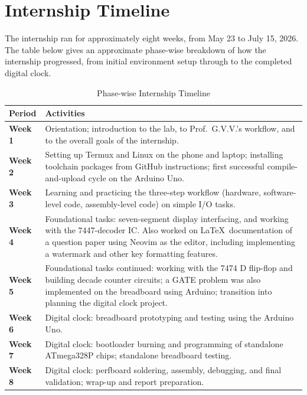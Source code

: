 \documentclass[12pt,a4paper]{report}
\begin{document}
\chapter{Internship Timeline}
\label{ch:timeline}

The internship ran for approximately eight weeks, from May 23 to July 15, 2026. The table below gives an approximate phase-wise breakdown of how the internship progressed, from initial environment setup through to the completed digital clock.

\begin{table}[H]
\centering
\caption{Phase-wise Internship Timeline}
\label{tab:timeline}
\begin{tabular}{@{}>{\bfseries}lp{10.8cm}@{}}
\toprule
Period & \textbf{Activities} \\
\midrule
Week 1 & Orientation; introduction to the lab, to Prof.\ G.V.V.'s workflow, and to the overall goals of the internship. \\
Week 2 & Setting up Termux and Linux on the phone and laptop; installing toolchain packages from GitHub instructions; first successful compile-and-upload cycle on the Arduino Uno. \\
Week 3 & Learning and practicing the three-step workflow (hardware, software-level code, assembly-level code) on simple I/O tasks. \\
Week 4 & Foundational tasks: seven-segment display interfacing, and working with the 7447-decoder IC. Also worked on \LaTeX\ documentation of a question paper using Neovim as the editor, including implementing a watermark and other key formatting features. \\
Week 5 & Foundational tasks continued: working with the 7474 D flip-flop and building decade counter circuits; a GATE problem was also implemented on the breadboard using Arduino; transition into planning the digital clock project. \\
Week 6 & Digital clock: breadboard prototyping and testing using the Arduino Uno. \\
Week 7 & Digital clock: bootloader burning and programming of standalone ATmega328P chips; standalone breadboard testing. \\
Week 8 & Digital clock: perfboard soldering, assembly, debugging, and final validation; wrap-up and report preparation. \\
\bottomrule
\end{tabular}
\end{table}
\end{document}
